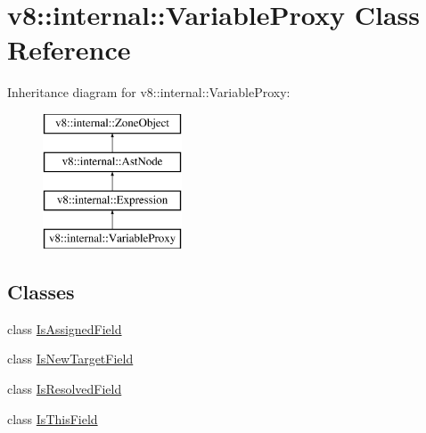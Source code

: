 \hypertarget{classv8_1_1internal_1_1_variable_proxy}{}\section{v8\+:\+:internal\+:\+:Variable\+Proxy Class Reference}
\label{classv8_1_1internal_1_1_variable_proxy}
Inheritance diagram for v8\+:\+:internal\+:\+:Variable\+Proxy\+:\begin{figure}[H]
\begin{center}
\leavevmode
\includegraphics[height=4.000000cm]{classv8_1_1internal_1_1_variable_proxy}
\end{center}
\end{figure}
\subsection*{Classes}
\begin{DoxyCompactItemize}
\item 
class \hyperlink{classv8_1_1internal_1_1_variable_proxy_1_1_is_assigned_field}{Is\+Assigned\+Field}
\item 
class \hyperlink{classv8_1_1internal_1_1_variable_proxy_1_1_is_new_target_field}{Is\+New\+Target\+Field}
\item 
class \hyperlink{classv8_1_1internal_1_1_variable_proxy_1_1_is_resolved_field}{Is\+Resolved\+Field}
\item 
class \hyperlink{classv8_1_1internal_1_1_variable_proxy_1_1_is_this_field}{Is\+This\+Field}
\end{DoxyCompactItemize}
